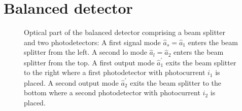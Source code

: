\section{Balanced detector}


\begin{figure}[htb]
    \centering
    
    \caption{Optical part of the balanced detector comprising a beam splitter and two photodetectors: A first signal mode $\hat{a}_s=\hat{a}_1$ enters the beam splitter from the left. A second \gls{lo} mode $\hat{a}_l=\hat{a}_2$ enters the beam splitter from the top. A first output mode $\hat{a}_1^\prime$ exits the beam splitter to the right where a first photodetector with photocurrent $i_1$ is placed. A second output mode $\hat{a}_2^\prime$ exits the beam splitter to the bottom where a second photodetector with photocurrent $i_2$ is placed.}\label{fig:balanced_detector_optics}
\end{figure}

